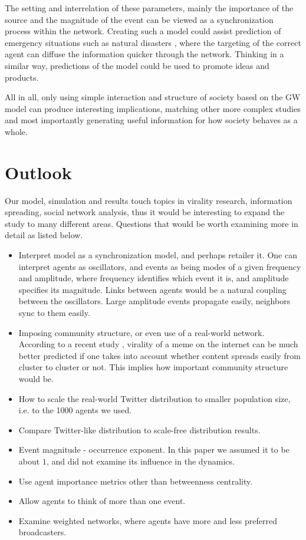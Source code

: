 \documentclass [12pt,a4paper,twoside]{article}
\begin{document}
The setting and interrelation of these parameters, mainly the importance of the source and the magnitude of the event can be viewed as a synchronization process within the network. Creating such a model could assist prediction of emergency situations such as natural disasters \cite{rand2015}, where the targeting of the correct agent can diffuse the information quicker through the network. Thinking in a similar way, predictions of the model could be used to promote ideas and products. 

All in all, only using simple interaction and structure of society based on the GW model can produce interesting implications, matching other more complex studies and most importantly generating useful information for how society behaves as a whole. 

\section{Outlook}

Our model, simulation and results touch topics in virality research, information spreading, social network analysis, thus it would be interesting to expand the study to many different areas. Questions that would be worth examining more in detail as listed below.

\begin{itemize}
\item Interpret model as a synchronization model, and perhaps retailer it. One can interpret agents as oscillators, and events as being modes of a given frequency and amplitude, where frequency identifies which event it is, and amplitude specifies its magnitude. Links between agents would be a natural coupling between the oscillators. Large amplitude events propagate easily, neighbors sync to them easily.
\item Imposing community structure, or even use of a real-world network. According to a recent study \cite{Virality-community-important}, virality of a meme on the internet can be much better predicted if one takes into account whether content spreads easily from cluster to cluster or not. This implies how important community structure would be.
\item How to scale the real-world Twitter distribution to smaller population size, i.e. to the 1000 agents we used.
\item Compare Twitter-like distribution to scale-free distribution results.
\item Event magnitude - occurrence exponent. In this paper we assumed it to be about $1$, and did not examine its influence in the dynamics.
\item Use agent importance metrics other than betweenness centrality.
\item Allow agents to think of more than one event.
\item Examine weighted networks, where agents have more and less preferred broadcasters.
\end{itemize}

\small \setlength{\bibsep}{1pt}

%

\end{document}

